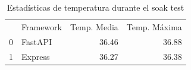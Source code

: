\begin{table}
\caption{Estadísticas de temperatura durante el soak test}
\label{tab:temp_soak}
\begin{tabular}{llrr}
 & Framework & Temp. Media & Temp. Máxima \\
0 & FastAPI & 36.46 & 36.88 \\
1 & Express & 36.27 & 36.38 \\
\end{tabular}
\end{table}
